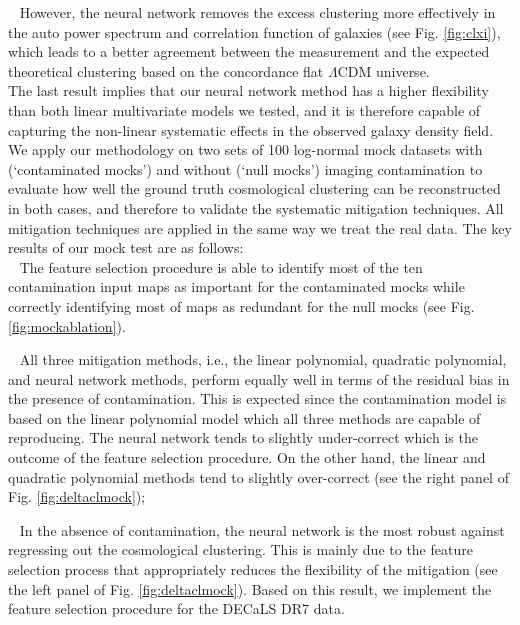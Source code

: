 \documentclass[fleqn, usenatbib]{mnras}
\begin{document}
\textbullet ~ However, the neural network removes the excess clustering more effectively  in the auto power spectrum and correlation function of galaxies (see Fig. \ref{fig:clxi}), which leads to a better agreement between the measurement and the expected theoretical clustering based on the concordance flat $\Lambda$CDM universe.\\ 


The last result implies that our neural network method has a higher flexibility than both linear multivariate models we tested, and it is therefore capable of capturing the non-linear systematic effects in the observed galaxy density field.\\

We apply our methodology on two sets of 100 log-normal mock datasets with (`contaminated mocks') and without (`null mocks') imaging contamination  to evaluate how well the ground truth cosmological clustering can be reconstructed in both cases, and therefore to validate the systematic mitigation techniques. All mitigation techniques are applied in the same way we treat the real data. The key results of our mock test are as follows:\\

\textbullet ~ The feature selection procedure is able to identify most of the ten contamination input maps as important for the contaminated mocks while correctly identifying most of maps as redundant for the null mocks (see Fig. \ref{fig:mockablation}).

\textbullet ~    All three mitigation methods, i.e., the linear polynomial, quadratic polynomial, and neural network methods, perform equally well in terms of the residual bias in the presence of contamination. This is  expected since the contamination model is based on the linear polynomial model which all three methods are capable of reproducing. The neural network tends to slightly under-correct which is the outcome of the feature selection procedure. On the other hand, the linear and quadratic polynomial methods tend to slightly over-correct (see the right panel of Fig. \ref{fig:deltaclmock});

\textbullet ~    In the absence of contamination, the neural network is the most robust against regressing out the cosmological clustering. This is mainly due to the feature selection process that appropriately reduces the flexibility of the mitigation (see the left panel of Fig. \ref{fig:deltaclmock}). Based on this result, we implement the feature selection procedure for the DECaLS DR7 data.
    
\end{document}
